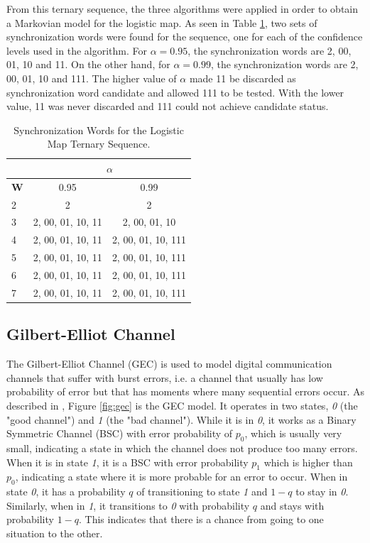 {From this ternary sequence, the three algorithms were applied in order to obtain a Markovian model for the logistic map. As seen in Table \ref{tab:lmapsynch}, two sets of synchronization words were found for the sequence, one for each of the confidence levels used in the algorithm. For $\alpha = 0.95$, the synchronization words are 2, 00, 01, 10 and 11. On the other hand, for $\alpha = 0.99$, the synchronization words are 2, 00, 01, 10 and 111. The higher value of $\alpha$ made 11 be discarded as synchronization word candidate and allowed 111 to be tested. With the lower value, 11 was never discarded and 111 could not achieve candidate status.

\begin{table}
\centering
\caption{Synchronization Words for the Logistic Map Ternary Sequence. \label{tab:lmapsynch}}
\begin{tabular}{|l|c|c|}
\hline
 & \multicolumn{2}{c|}{\textbf{$\alpha$}}\\
 \hline
\textbf{W} & 0.95 & 0.99 \\
\hline
2 & 2 & 2 \\ 
3 & 2, 00, 01, 10, 11 & 2, 00, 01, 10 \\ 
4 & 2, 00, 01, 10, 11 & 2, 00, 01, 10, 111 \\ 
5 & 2, 00, 01, 10, 11 & 2, 00, 01, 10, 111 \\
6 & 2, 00, 01, 10, 11 & 2, 00, 01, 10, 111 \\ 
7 & 2, 00, 01, 10, 11 & 2, 00, 01, 10, 111 \\ 
 \hline
\end{tabular}
\end{table}

\subsection{Gilbert-Elliot Channel}

The Gilbert-Elliot Channel (GEC) is used to model digital communication channels that suffer with burst errors, i.e. a channel that usually has low probability of error but that has moments where many sequential errors occur. As described in \cite{mushkin.89}, Figure \ref{fig:gec} is the GEC model. It operates in two states, \textit{0} (the "good channel") and \textit{1} (the "bad channel"). While it is in \textit{0}, it works as a Binary Symmetric Channel (BSC) with error probability of $p_0$, which is usually very small, indicating a state in which the channel does not produce too many errors. When it is in state \textit{1}, it is a BSC with error probability $p_1$ which is higher than $p_0$, indicating a state where it is more probable for an error to occur. When in state \textit{0}, it has a probability $q$ of transitioning to state \textit{1} and $1-q$ to stay in \textit{0}. Similarly, when in \textit{1}, it transitions to \textit{0} with probability $q$ and stays with probability $1-q$. This indicates that there is a chance from going to one situation to the other.

}
